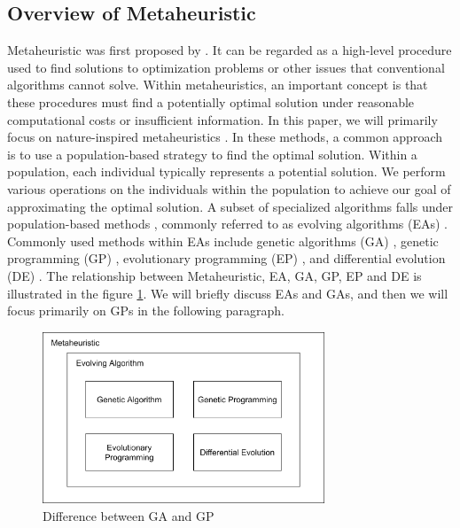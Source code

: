 \begin{ZhChapter}
    \subsection{Overview of Metaheuristic}
    Metaheuristic \cite{glover1986future} was first proposed by \citeauthor{glover1986future}. It can be regarded as a high-level procedure used to find solutions to optimization problems or other issues that conventional algorithms cannot solve. Within metaheuristics, an important concept is that these procedures must find a potentially optimal solution under reasonable computational costs or insufficient information. In this paper, we will primarily focus on nature-inspired metaheuristics \cite{yang2010nature}. In these methods, a common approach is to use a population-based strategy to find the optimal solution. Within a population, each individual typically represents a potential solution. We perform various operations on the individuals within the population to achieve our goal of approximating the optimal solution. A subset of specialized algorithms falls under population-based methods \cite{enwiki:1255593755}, commonly referred to as evolving algorithms (EAs) \cite{muhlenbein1988evolution}. Commonly used methods within EAs include genetic algorithms (GA) \cite{kumar2010genetic}, genetic programming (GP) \cite{geneticProgramming} , evolutionary programming (EP) \cite{yao1999evolutionary}, and differential evolution (DE) \cite{das2010differential}. The relationship between Metaheuristic, EA, GA, GP, EP and DE is illustrated in the figure \ref{fig: relationshipMap}. We will briefly discuss EAs and GAs, and then we will focus primarily on GPs in the following paragraph.
    \begin{figure}[htbp]
        \centering
        \includegraphics[width = 0.75\textwidth]{image/metaheuristic.png}
        \caption{Difference between GA and GP}
        \label{fig: relationshipMap}
    \end{figure}

\end{ZhChapter}
